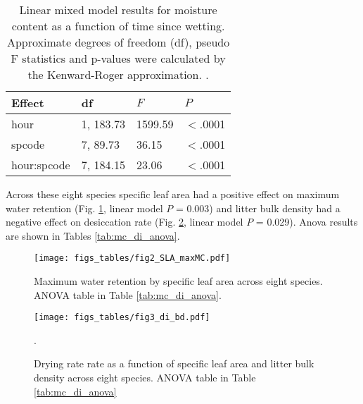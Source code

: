 \documentclass[letterpaper,12pt]{article}
\begin{document}
\begin{table}[h]
  \caption{Linear mixed model results for moisture content as a function of
    time since wetting. Approximate degrees of freedom (df), pseudo F
    statistics and p-values were calculated by the Kenward-Roger approximation.
    \citep{Kenward_Roger-1997}.}
  \label{tab:drydown}
\centering
\begin{tabular}{llll}
  \toprule
Effect & df & $F$ & $P$ \\ 
  \midrule
hour & 1, 183.73 & 1599.59 & $<$.0001 \\ 
  spcode & 7, 89.73 & 36.15 & $<$.0001 \\ 
  hour:spcode & 7, 184.15 & 23.06 & $<$.0001 \\ 
   \bottomrule
\end{tabular}
\end{table}


Across these eight species specific leaf area had a positive effect on maximum
water retention (Fig. \ref{fig:maxmc-di}, linear model $P$ = 0.003) and litter
bulk density had a negative effect on desiccation rate (Fig. \ref{fig:bd-di},
linear model $P$ = 0.029). Anova results are shown in Tables
\ref{tab:mc_di_anova}.

\begin{figure}[h]
  \centering
\texttt{[image: figs\_tables/fig2\_SLA\_maxMC.pdf]}
\caption{Maximum water retention by specific leaf area across eight species.
  ANOVA table in Table \ref{tab:mc_di_anova}.}
  \label{fig:maxmc-di}
\end{figure}


\begin{figure}[h]
  \centering
\texttt{[image: figs\_tables/fig3\_di\_bd.pdf]}
\caption{Drying rate rate as a function of specific leaf area and litter bulk
  density across eight species. ANOVA table in Table \ref{tab:mc_di_anova}}.
  \label{fig:bd-di}
\end{figure}
\end{document}

